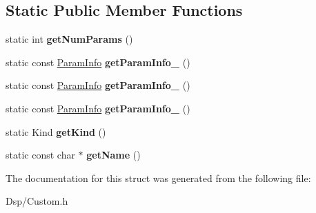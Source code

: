 \subsection*{Static Public Member Functions}
\begin{DoxyCompactItemize}
\item 
\hypertarget{structDsp_1_1Custom_1_1Design_1_1OnePole_a511fe2bbf58238531980d4d52c1a6b27}{static int {\bfseries get\-Num\-Params} ()}\label{structDsp_1_1Custom_1_1Design_1_1OnePole_a511fe2bbf58238531980d4d52c1a6b27}

\item 
\hypertarget{structDsp_1_1Custom_1_1Design_1_1OnePole_aa39862df9362f436438d3d46174c2454}{static const \hyperlink{classDsp_1_1ParamInfo}{Param\-Info} {\bfseries get\-Param\-Info\-\_} ()}\label{structDsp_1_1Custom_1_1Design_1_1OnePole_aa39862df9362f436438d3d46174c2454}

\item 
\hypertarget{structDsp_1_1Custom_1_1Design_1_1OnePole_a0a72051cf937e7a715efc3a31bcb0e82}{static const \hyperlink{classDsp_1_1ParamInfo}{Param\-Info} {\bfseries get\-Param\-Info\-\_} ()}\label{structDsp_1_1Custom_1_1Design_1_1OnePole_a0a72051cf937e7a715efc3a31bcb0e82}

\item 
\hypertarget{structDsp_1_1Custom_1_1Design_1_1OnePole_ab5106fd1864ebbc17ff68b7172c4f16e}{static const \hyperlink{classDsp_1_1ParamInfo}{Param\-Info} {\bfseries get\-Param\-Info\-\_} ()}\label{structDsp_1_1Custom_1_1Design_1_1OnePole_ab5106fd1864ebbc17ff68b7172c4f16e}

\item 
\hypertarget{structDsp_1_1Custom_1_1Design_1_1OnePole_a26d04688dded66653b3d516326b86e3a}{static Kind {\bfseries get\-Kind} ()}\label{structDsp_1_1Custom_1_1Design_1_1OnePole_a26d04688dded66653b3d516326b86e3a}

\item 
\hypertarget{structDsp_1_1Custom_1_1Design_1_1OnePole_a56b0876127b828556e52c70460a3d612}{static const char $\ast$ {\bfseries get\-Name} ()}\label{structDsp_1_1Custom_1_1Design_1_1OnePole_a56b0876127b828556e52c70460a3d612}

\end{DoxyCompactItemize}


The documentation for this struct was generated from the following file\-:\begin{DoxyCompactItemize}
\item 
Dsp/Custom.\-h\end{DoxyCompactItemize}
